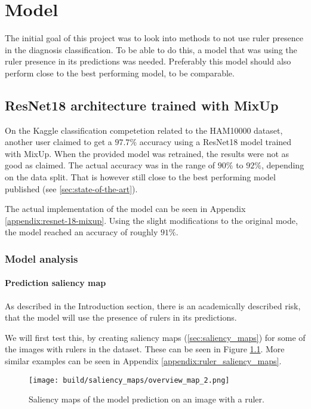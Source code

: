 \chapter{Model}
The initial goal of this project was to look into methods to not use ruler presence in the
diagnosis classification.
To be able to do this, a model that was using the ruler presence in its predictions was needed.
Preferably this model should also perform close to the best performing model, to be comparable.

\section{ResNet18 architecture trained with MixUp}
On the Kaggle classification competetion related to the HAM10000 dataset\cite{HAM10000-kaggle-competetion},
another user claimed to get a $97.7\%$ accuracy using a ResNet18 model trained with MixUp\cite{kaggle-97-model}.
When the provided model was retrained, the results were not as good as claimed.
The actual accuracy was in the range of $90\%$ to $92\%$, depending on the data split.
That is however still close to the best performing model published (see \ref{sec:state-of-the-art}).

The actual implementation of the model can be seen in Appendix \ref{appendix:resnet-18-mixup}.
Using the slight modifications to the original mode, the model reached an accuracy of roughly $91\%$.

\subsection{Model analysis}
\subsubsection{Prediction saliency map}
As described in the Introduction section, there is an academically described risk,
that the model will use the presence of rulers in its predictions. %

We will first test this, by creating saliency maps (\ref{sec:saliency_maps}) for some of the images with rulers in the dataset.
These can be seen in Figure \ref{fig:ruler_saliency_map}.
More similar examples can be seen in Appendix \ref{appendix:ruler_saliency_maps}.

\begin{figure}[h]
    \texttt{[image: build/saliency\_maps/overview\_map\_2.png]}
    \caption{Saliency maps of the model prediction on an image with a ruler.}
    \label{fig:ruler_saliency_map}
\end{figure}

